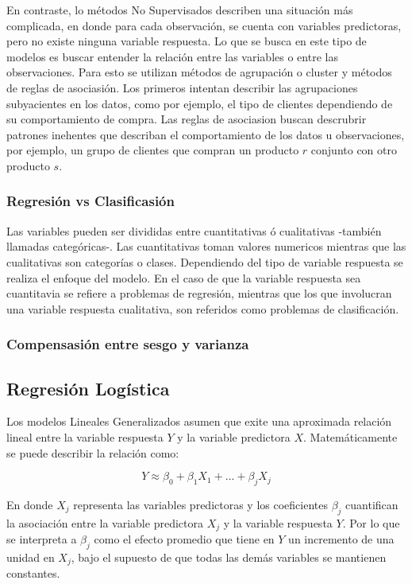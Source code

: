 \documentclass[a4paper,12pt]{Latex/Classes/PhDthesisPSnPDF}
\begin{document}
En contraste, lo métodos No Supervisados describen una situación más complicada, en donde para cada observación, se cuenta con variables predictoras, pero no existe ninguna variable respuesta. Lo que se busca en este tipo de modelos es buscar entender la relación entre las variables o entre las observaciones. Para esto se utilizan métodos de agrupación o cluster y métodos de reglas de asociasión. Los primeros intentan describir las agrupaciones subyacientes en los datos, como por ejemplo, el tipo de clientes dependiendo de su comportamiento de compra. Las reglas de asociasion buscan descrubrir patrones inehentes que describan el comportamiento de los datos u observaciones, por ejemplo, un grupo de clientes que compran un producto $r$ conjunto con otro producto $s$.

\subsubsection{Regresión vs Clasificasión}

Las variables pueden ser divididas entre cuantitativas ó cualitativas -también llamadas categóricas-. Las cuantitativas toman valores numericos mientras que las cualitativas son categorías o clases. Dependiendo del tipo de variable respuesta se realiza el enfoque del modelo. En el caso de que la variable respuesta sea cuantitavia se refiere a problemas de regresión, mientras que los que involucran una variable respuesta cualitativa, son referidos como problemas de clasificación.

\subsubsection{Compensasión entre sesgo y varianza}


\subsection{Regresión Logística}

Los modelos Lineales Generalizados asumen que exite una aproximada relación lineal entre la variable respuesta $Y$ y la variable predictora $X$. Matemáticamente se puede describir la relación como:

$$ Y \approx \beta_{0} + \beta_{1}X_{1} + ... + \beta_{j}X_{j} $$

En donde $X_{j}$ representa las variables predictoras y los coeficientes $\beta_{j}$ cuantifican la asociación entre la variable predictora $X_{j}$ y la variable respuesta $Y$. Por lo que se interpreta a $\beta_{j}$ como el efecto promedio que tiene en $Y$ un incremento de una unidad en $X_{j}$, bajo el supuesto de que todas las demás variables se mantienen constantes.
\end{document}
